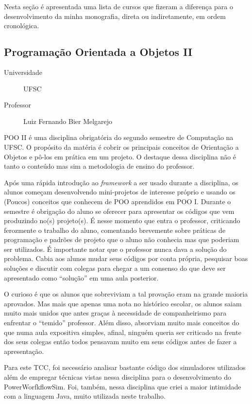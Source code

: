 Nesta seção é apresentada uma lista de cursos que fizeram a diferença para o
desenvolvimento da minha monografia, direta ou indiretamente, em ordem
cronológica.

\subsection{Programação Orientada a Objetos II}
\begin{description}
	\item[Universidade] UFSC
	\item[Professor] Luiz Fernando Bier Melgarejo
\end{description}
POO II é uma disciplina obrigatória do segundo semestre de Computação na UFSC.
O propósito da matéria é cobrir os principais conceitos de Orientação a Objetos
e pô-los em prática em um projeto. O destaque dessa disciplina não é tanto o
conteúdo mas sim a metodologia de ensino do professor.

Após uma rápida introdução ao \emph{framework} a ser usado durante a disciplina,
os alunos começam desenvolvendo mini-projetos de interesse próprio e usando os
(Poucos) conceitos que conhecem de POO aprendidos em POO I. Durante o semestre é
obrigação do aluno se oferecer para apresentar os códigos que vem produzindo
no(s) projeto(s). É nesse momento que entra o professor, criticando ferozmente o
trabalho do aluno, comentando brevemente sobre práticas de programação e padrões
de projeto que o aluno não conhecia mas que poderiam ser utilizados. É
importante notar que o professor nunca dava a solução do problema. Cabia aos
alunos mudar seus códigos por conta própria, pesquisar boas soluções e  discutir
com colegas para chegar a um consenso do que deve ser apresentado como
``solução'' em uma aula posterior.

O curioso é que os alunos que sobreviviam a tal provação eram na grande maioria
aprovados. Mas mais que apenas uma nota no histórico escolar, os alunos saiam
muito mais unidos que antes graças à necessidade de companheirismo para
enfrentar o ``temido'' professor. Além disso, absorviam muito mais conceitos
do que numa aula expositiva simples, afinal, ninguém queria ser criticado na 
frente dos seus colegas então todos pensavam muito em seus códigos antes de 
fazer a apresentação.

Para este TCC, foi necessário analisar bastante código dos simuladores
utilizados além de empregar técnicas vistas nessa disciplina para o
desenvolvimento do PowerWorfkflowSim. Foi, também, nessa disciplina que criei
a maior intimidade com a linguagem Java, muito utilizada neste trabalho.

